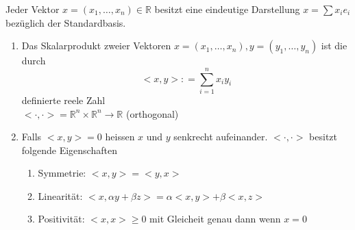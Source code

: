 Jeder Vektor $x=\left(x_1,\dots,x_n \right)\in\mathbb{R}$ besitzt eine eindeutige Darstellung $x=\sum x_ie_i$ bezüglich der Standardbasis.
\begin{definition}{2.16}
\begin{enumerate}
\item Das Skalarprodukt zweier Vektoren $x=\left(x_1,\dots,x_n \right),y=\left(y_1,\dots,y_n \right)$ ist die durch \[ < x,y > : = \sum\limits_{i = 1}^n {{x_i}{y_i}} \] definierte reele Zahl\\ $<\cdot,\cdot>=\mathbb{R}^n\times\mathbb{R}^n\to\mathbb{R}$ (orthogonal)
\item Falls $<x,y>=0$ heissen $x$ und $y$ senkrecht aufeinander. $<\cdot,\cdot>$ besitzt folgende Eigenschaften
\begin{enumerate}
\item Symmetrie: $<x,y>=<y,x>$
\item Linearität: $<x,\alpha y+\beta z>=\alpha <x,y>+\beta <x,z>$
\item Positivität: $<x,x>\geq 0$ mit Gleicheit genau dann wenn $x=0$
\end{enumerate}
\end{enumerate}
\end{definition}

